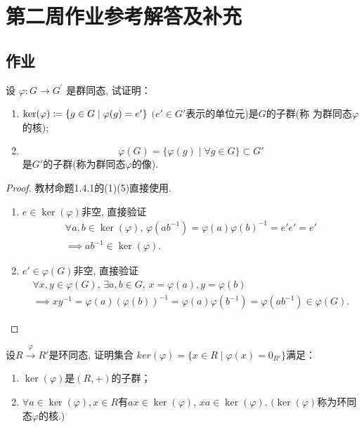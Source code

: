 \documentclass{../solutions-cn}
\begin{document}
\section*{第二周作业参考解答及补充}

\subsection*{作业}

\begin{exercise}[习题1.4.1]
    设 $\varphi:G\to G^\prime$ 是群同态, 试证明：
\begin{enumerate}[(1)]
    \item $\ker(\varphi) \mathrel{\coloneqq} \{g \in G \mid \varphi(g) = e'\}$ $(e' \in G'$表示的单位元)是$G$的子群(称
为群同态$\varphi$的核);
    \item \[\varphi(G) = \{\varphi(g) \mid \forall g \in G\} \subset G'\]
是$G'$的子群(称为群同态$\varphi$的像).
\end{enumerate}
\end{exercise}

\begin{proof}
    教材命题1.4.1的(1)(5)直接使用.
\begin{enumerate}[(1)]
    \item $e \in \ker(\varphi)$非空, 直接验证\[
    \begin{gathered}
        \forall a, b \in \ker(\varphi),\, \varphi(ab^{-1}) = \varphi(a)\varphi(b)^{-1} = e'e' = e'\\
        \implies ab^{-1} \in \ker(\varphi).
    \end{gathered}
    \]
    \item $e' \in \varphi(G)$非空, 直接验证\[
    \begin{gathered}
        \forall x, y \in \varphi(G),\, \exists a, b \in G,\, x = \varphi(a), y = \varphi(b)\\
        \implies xy^{-1} = \varphi(a)(\varphi(b))^{-1} = \varphi(a)\varphi(b^{-1}) = \varphi(ab^{-1}) \in \varphi(G).
    \end{gathered}
    \]
\end{enumerate}
\end{proof}

\begin{exercise}[习题1.4.3]
    设$R \overset{\varphi}\to R'$是环同态, 证明集合
$ker(\varphi) = \{x \in R \mid \varphi(x) = 0_{R'}\}$满足：
\begin{enumerate}[(1)]
    \item $\ker(\varphi)$是$(R, +)$的子群；
    \item $\forall a \in \ker (\varphi), x \in R$有$ax \in \ker(\varphi)$, $xa \in \ker (\varphi)$.
$(\ker(\varphi)$称为环同态$\varphi$的核.)
\end{enumerate}
\end{exercise}
\end{document}
